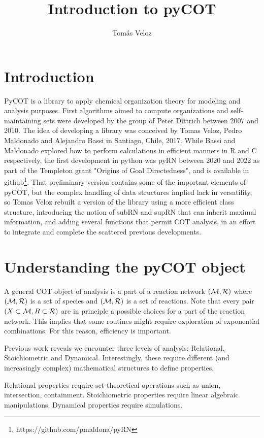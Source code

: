 \documentclass[12pt]{article}
\begin{document}
\title{Introduction to pyCOT}
\author{Tom\'as Veloz }
\date{}
\maketitle
\section{Introduction}
PyCOT is a library to apply chemical organization theory for modeling and analysis purposes. First algorithms aimed to compute organizations and self-maintaining sets were developed by the group of Peter Dittrich between 2007 and 2010. The idea of developing a library was conceived by Tomas Veloz, Pedro Maldonado and Alejandro Bassi in Santiago, Chile, 2017. While Bassi and Maldonado explored how to perform calculations in efficient manners in R and C respectively, the first development in python was pyRN between 2020 and 2022 as part of the Templeton grant "Origins of Goal Directedness", and is available in github\footnote{https://github.com/pmaldona/pyRN}. That preliminary version contains some of the important elements of pyCOT, but the complex handling of data structures implied lack in versatility, so
Tomas Veloz rebuilt a version of the library using a more efficient class structure, introducing the notion of subRN and supRN that can inherit maximal information, and adding several functions that permit COT analysis, in an effort to integrate and complete the scattered previous developments.

\section{Understanding the pyCOT object}


A general COT object of analysis is a part of a reaction network $({\cal M}, {\cal R})$ where $({\cal M}, {\cal R})$ is a set of species and $({\cal M}, {\cal R})$ is a set of reactions. Note that every pair $(X\subset {\cal M}, R\subset {\cal R})$ are in principle a possible choices for a part of the reaction network. This implies that some routines might require exploration of exponential combinations. For this reason, efficiency is important.

Previous work reveals we encounter three levels of analysis: Relational, Stoichiometric and Dynamical. Interestingly, these require different (and increasingly complex) mathematical structures to define properties. 

Relational properties require set-theoretical operations such as union, intersection, containment. Stoichiometric properties require linear algebraic manipulations. Dynamical properties require simulations.
\end{document}
